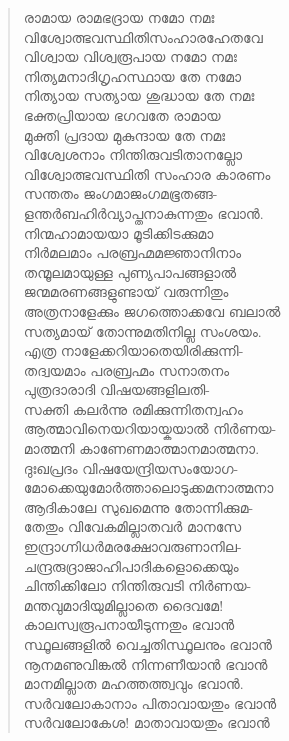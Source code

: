 \begin{verse}
രാമായ രാമഭദ്രായ നമോ നമഃ\\
വിശ്വോത്ഭവസ്ഥിതിസംഹാരഹേതവേ\\
വിശ്വായ വിശ്വരൂപായ നമോ നമഃ\\
നിത്യമനാദിഗൃഹസ്ഥായ തേ നമോ\\
നിത്യായ സത്യായ ശുദ്ധായ തേ നമഃ\\
ഭക്തപ്രിയായ ഭഗവതേ രാമായ\\
മുക്തി പ്രദായ മുകുന്ദായ തേ നമഃ\\
വിശ്വേശനാം നിന്തിരുവടിതാനല്ലോ\\
വിശ്വോത്ഭവസ്ഥിതി സംഹാര കാരണം\\
സന്തതം ജംഗമാജംഗമഭൂതങ്ങ-\\
ളന്തര്‍ബഹിര്‍വ്യാപ്തനാകുന്നതും ഭവാന്‍.\\
നിന്മഹാമായയാ മൂടിക്കിടക്കുമാ\\
നിര്‍മലമാം പരബ്രഹ്മമജ്ഞാനിനാം\\
തന്മൂലമായുള്ള പുണ്യപാപങ്ങളാല്‍\\
ജന്മമരണങ്ങളുണ്ടായ് വരുന്നിതും\\
അത്രനാളേക്കും ജഗത്തൊക്കവേ ബലാല്‍\\
സത്യമായ് തോന്നുമതിനില്ല സംശയം.\\
എത്ര നാളേക്കറിയാതെയിരിക്കുന്നി-\\
തദ്വയമാം പരബ്രഹ്മം സനാതനം\\
പുത്രദാരാദി വിഷയങ്ങളിലതി-\\
സക്തി കലര്‍ന്നു രമിക്കുന്നിതന്വഹം\\
ആത്മാവിനെയറിയായ്കയാല്‍ നിര്‍ണയ-\\
മാത്മനി കാണേണമാത്മാനമാത്മനാ.\\
ദുഃഖപ്രദം വിഷയേന്ദ്രിയസംയോഗ-\\
മോക്കെയുമോര്‍ത്താലൊടുക്കമനാത്മനാ\\
ആദികാലേ സുഖമെന്നു തോന്നിക്കുമ-\\
തേതും വിവേകമില്ലാതവര്‍ മാനസേ\\
ഇന്ദ്രാഗ്നിധര്‍മരക്ഷോവരുണാനില-\\
ചന്ദ്രരുദ്രാജാഹിപാദികളൊക്കെയും\\
ചിന്തിക്കിലോ നിന്തിരുവടി നിര്‍ണയ-\\
മന്തവുമാദിയുമില്ലാതെ ദൈവമേ!\\
കാലസ്വരൂപനായീടുന്നതും ഭവാന്‍\\
സ്ഥൂലങ്ങളില്‍ വെച്ചതിസ്ഥൂലനും ഭവാന്‍\\
നൂനമണുവിങ്കല്‍ നിന്നണീയാന്‍ ഭവാന്‍\\
മാനമില്ലാത മഹത്തത്ത്വവും ഭവാന്‍.\\
സര്‍വലോകാനാം പിതാവായതും ഭവാന്‍\\
സര്‍വലോകേശ! മാതാവായതും ഭവാന്‍\\

\end{verse}

